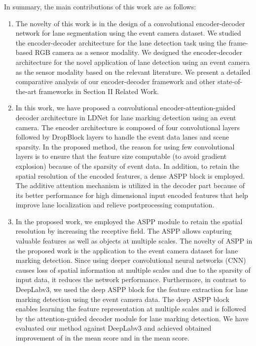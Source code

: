 \documentclass[journal]{IEEEtran}
\begin{document}
\par
In summary, the main contributions of this work are as follows:
\begin{enumerate}

             \item   The novelty of this work is in the design of a convolutional encoder-decoder network for lane segmentation using the event camera dataset. We studied the encoder-decoder architecture for the lane detection task using the frame-based RGB camera as a sensor modality. We designed the encoder-decoder architecture for the novel application of lane detection using an event camera as the sensor modality based on the relevant literature. We present a detailed comparative analysis of our encoder-decoder framework and other state-of-the-art frameworks in Section II Related Work.
             \item  In this work, we have proposed a convolutional encoder-attention-guided decoder architecture in LDNet for lane marking detection using an event camera. The encoder architecture is composed of four convolutional layers followed by DropBlock layers to handle the event data lanes and scene sparsity. In the proposed method, the reason for using few convolutional layers is to ensure that the feature size computable (to avoid gradient explosion) because of the sparsity of event data. In addition, to retain the spatial resolution of the encoded features, a dense ASPP block is employed. The additive attention mechanism is utilized in the decoder part because of its better performance for high dimensional input encoded features that help improve lane localization and relieve postprocessing computation.
             \item In the proposed work, we employed the ASPP module to retain the spatial resolution by increasing the receptive field. The ASPP allows capturing valuable features as well as objects at multiple scales. The novelty of ASPP in the proposed work is the application to the event camera dataset for lane marking detection. Since using deeper convolutional neural networks (CNN) causes loss of spatial information at multiple scales and due to the sparsity of input data, it reduces the network performance. Furthermore, in contrast to DeepLabv3, we used the deep ASPP block for the feature extraction for lane marking detection using the event camera data. The deep ASPP block enables learning the feature representation at multiple scales and is followed by the attention-guided decoder module for lane marking detection. We have evaluated our method against DeepLabv3 and achieved obtained improvement of  in the mean  score and  in the mean  score. 
\end{enumerate}
\end{document}
